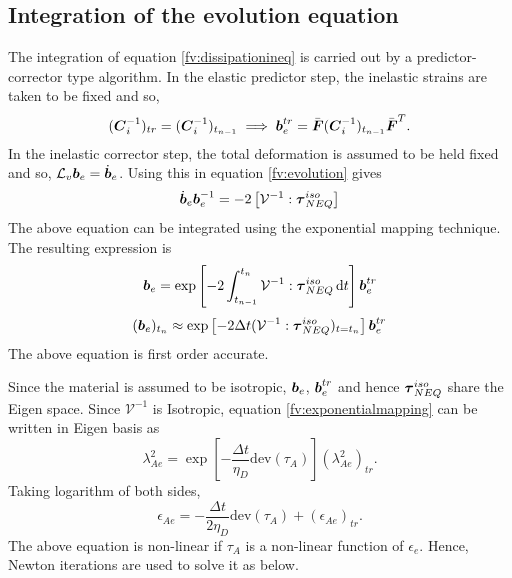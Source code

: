 \documentclass[11pt,twoside,TimesRoman]{article}
\begin{document}
\subsection{Integration of the evolution equation}
The integration of equation \ref{fv:dissipationineq} is carried out by a predictor-corrector type algorithm. In the elastic predictor step, the inelastic strains are taken to be fixed and so,
\begin{equation}
	(\mbox{\boldmath $C$}_i^{-1})_{tr} = 	(\mbox{\boldmath $C$}_i^{-1})_{t_{n-1}} \implies \mbox{\boldmath $b$}_e^{tr} = \bar{\mbox{\boldmath $F$}} (\mbox{\boldmath $C$}_i^{-1})_{t_{n-1}} \bar{\mbox{\boldmath $F$}}^T.
\end{equation}
In the inelastic corrector step, the total deformation is assumed to be held fixed and so, $\mathcal{L}_v\mbox{\boldmath $b$}_e = \dot{\mbox{\boldmath $b$}}_e$. Using this in equation \ref{fv:evolution} gives
\begin{equation}
	\dot{\mbox{\boldmath $b$}}_e {\mbox{\boldmath $b$}}^{-1}_e = -2 \left[\mathcal{V}^{-1} : \boldsymbol{\tau}_{NEQ}^{iso} \right]
\end{equation}
The above equation can be integrated using the exponential mapping technique. The resulting expression is 
\begin{equation}
	{\mbox{\boldmath $b$}}_e  = \exp  \left[ -2 \int_{t_{n-1}}^{t_n} \mathcal{V}^{-1} : \boldsymbol{\tau}_{NEQ}^{iso} \mathop{}\!\mathrm{d} t \right] \mbox{\boldmath $b$}_e^{tr}
\end{equation}
\begin{equation}
	({\mbox{\boldmath $b$}}_e)_{t_n}  \approx \exp  \left[ -2 \Delta t (\mathcal{V}^{-1} : \boldsymbol{\tau}_{NEQ}^{iso})_{t=t_n} \right] \mbox{\boldmath $b$}_e^{tr}
	\label{fv:exponentialmapping}
\end{equation}
The above equation is first order accurate.

Since the material is assumed to be isotropic, ${\mbox{\boldmath $b$}}_e$, $\mbox{\boldmath $b$}_e^{tr}$ and hence $\mbox{\boldmath $\tau$}_{NEQ}^{iso}$ share the Eigen space. Since $\mathcal{V}^{-1}$ is Isotropic, equation \ref{fv:exponentialmapping} can be written in Eigen basis as
\begin{equation}
	\lambda_{Ae}^2 = \exp \left[- \frac{\Delta t }{\eta_D} \text{dev}(\tau_A) \right]  	(\lambda_{Ae}^2)_{tr}.
\end{equation}
Taking logarithm of both sides,
\begin{equation}
	\epsilon_{Ae} = - \frac{\Delta t }{2 \eta_D} \text{dev}(\tau_A) + 	(\epsilon_{Ae})_{tr}.
\end{equation}
The above equation is non-linear if $\tau_A$ is a non-linear function of $\epsilon_{e}$. Hence, Newton iterations are used to solve it as below.
\end{document}
